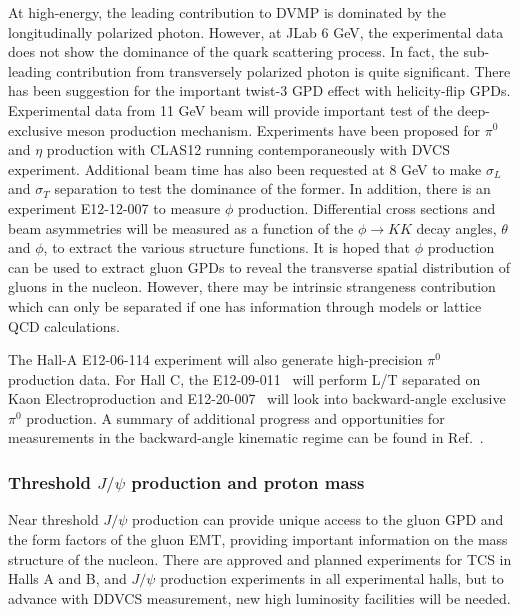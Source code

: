 At high-energy, the leading contribution to DVMP is dominated by 
the longitudinally polarized photon. However, at JLab 6 GeV, the 
experimental data does not show the dominance of the quark 
scattering process. In fact, the sub-leading contribution from
transversely polarized photon is quite significant. There has been suggestion
for the important twist-3 GPD effect with helicity-flip GPDs. 
Experimental data from 11 GeV beam will provide important
test of the deep-exclusive meson production mechanism. Experiments
have been proposed for $\pi^0$ and $\eta$ production with CLAS12 \cite{E12-06-108}
running contemporaneously with DVCS \cite{E12-06-119} experiment. Additional beam
time has also been requested at 8 GeV to make $\sigma_L$ and $\sigma_T$
separation to test the dominance of the former. 
In addition, there is an experiment E12-12-007\cite{E12-12-007} to measure $\phi$
production. Differential cross sections and beam asymmetries will be measured
as a function of the $\phi\rightarrow KK$ decay angles, $\theta$ and $\phi$, 
to extract the various structure functions. It is hoped 
that $\phi$ production can be used to extract gluon GPDs to reveal
the transverse spatial distribution of gluons in the nucleon. However, there %
may be intrinsic strangeness contribution which can
only be separated if one has information through models or lattice
QCD calculations.

The Hall-A E12-06-114 experiment will also generate high-precision $\pi^0$ production data. For Hall C, the E12-09-011~\cite{E12-09-011} will perform L/T separated on Kaon Electroproduction and E12-20-007~\cite{E12-20-007} will look into backward-angle exclusive $\pi^0$ production. A summary of additional progress and opportunities for measurements in the backward-angle kinematic regime can be found in Ref.~\cite{Gayoso:2021rzj}.

\subsubsection*{Threshold $J/\psi$ production and proton mass}
\label{sec:PMass}

Near threshold $J/\psi$ production can provide unique access to the gluon GPD and the form factors of the gluon EMT, providing important information on the mass structure of the nucleon. There are approved and planned experiments for TCS in Halls A and B, and $J/\psi$ production experiments in all experimental halls, but to advance with DDVCS measurement, new high luminosity facilities will be needed.


